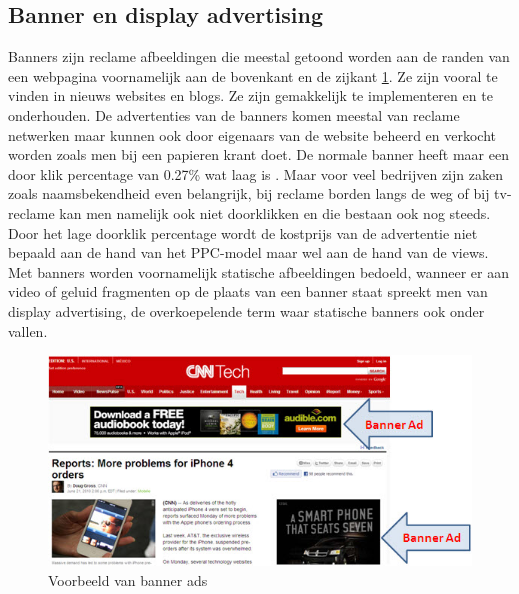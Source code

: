 \documentclass[pdftex,a4paper,12pt,twoside]{report}
\begin{document}
\subsection{Banner en display advertising }
\label{sec Banner en display advertising }
Banners zijn reclame afbeeldingen die meestal getoond worden aan de randen van een webpagina voornamelijk aan de bovenkant en de zijkant \ref{fig: Banner-Ads}. Ze zijn vooral te vinden in nieuws websites en blogs. Ze zijn gemakkelijk te implementeren en te onderhouden. De advertenties van de banners komen meestal van reclame netwerken maar kunnen ook door eigenaars van de website beheerd en verkocht worden zoals men bij een papieren krant doet. De normale banner heeft maar een door klik percentage van 0.27\% wat laag is \cite{Chaffey2016}. Maar voor veel bedrijven zijn zaken zoals naamsbekendheid even belangrijk, bij reclame borden langs de weg of bij tv-reclame kan men namelijk ook niet doorklikken en die bestaan ook nog steeds. Door het lage doorklik percentage wordt de kostprijs van de advertentie niet bepaald aan de hand van het PPC-model maar wel aan de hand van de views. Met banners worden voornamelijk statische afbeeldingen bedoeld, wanneer er aan video of geluid fragmenten op de plaats van een banner staat spreekt men van display advertising, de overkoepelende term waar statische banners ook onder vallen.
\begin{figure}[h!]
\centering
\includegraphics[width=12cm]{img/Banner-Ads}
\caption{Voorbeeld van banner ads}
\label{fig: Banner-Ads}
\end{figure}
\end{document}
